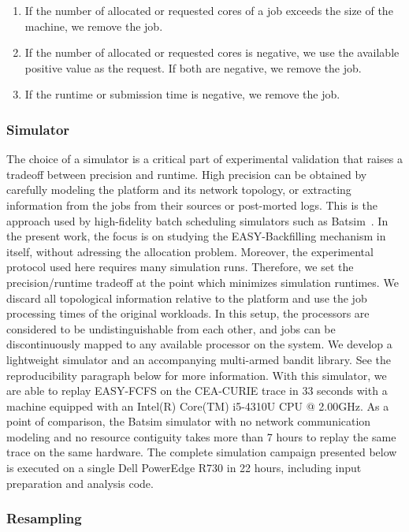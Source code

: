 \documentclass[sigconf]{acmart}
\begin{document}
\begin{enumerate}
  \item If the number of allocated or requested cores of a job  exceeds the size of the machine, we remove the job.
  \item If the number of allocated or requested cores is negative, we use the available positive value as the request. If both are negative, we remove the job.
  \item If the runtime or submission time is negative, we remove the job.
\end{enumerate}

\subsubsection{Simulator}

The choice of a simulator is a critical part of experimental validation that
raises a tradeoff between precision and runtime. High precision can be obtained
by carefully modeling the platform and its network topology, or extracting
information from the jobs from their sources or post-morted logs. This is the
approach used by high-fidelity batch scheduling simulators such as
Batsim~\cite{batsim}. In the present work, the focus is on studying the
EASY-Backfilling mechanism in itself, without adressing the allocation problem.
Moreover, the experimental protocol used here requires many simulation runs.
Therefore, we set the precision/runtime tradeoff at the point which minimizes
simulation runtimes. We discard all topological information relative to the
platform and use the job processing times of the original workloads. In this
setup, the processors are considered to be undistinguishable from each other,
and jobs can be discontinuously mapped to any available processor on the
system. We develop a lightweight simulator\cite{ocst} and an accompanying
multi-armed bandit library\cite{obandit}. See the reproducibility paragraph
below for more information.  With this simulator, we are able to replay
EASY-FCFS on the CEA-CURIE trace in 33 seconds with a machine equipped with an
Intel(R) Core(TM) i5-4310U CPU @ 2.00GHz. As a point of comparison, the Batsim
simulator with no network communication modeling and no resource contiguity
takes more than 7 hours to replay the same trace on the same hardware. The complete
simulation campaign presented below is executed on a single Dell PowerEdge R730 in 22
hours, including input preparation and analysis code.

\subsubsection{Resampling}
\label{ssub:resampling}
\end{document}
